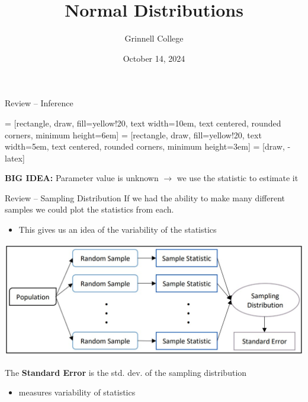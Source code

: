 \documentclass{beamer}
\title[Introduction to Statistics]{Normal Distributions}
\subtitle{}
\author{Grinnell College}
\date{October 14, 2024}
\begin{document}
\begin{frame}
  \titlepage
\end{frame}

\begin{frame}{Review -- Inference}
\begin{center}
\usetikzlibrary{decorations.pathreplacing,positioning, arrows, shapes, calc,shapes.multipart}
 = [rectangle, draw, fill=yellow!20, 
    text width=10em, text centered, rounded corners, minimum height=6em]
 = [rectangle, draw, fill=yellow!20, 
    text width=5em, text centered, rounded corners, minimum height=3em]
 = [draw, -latex]
  \end{center}
\textbf{BIG IDEA:} Parameter value is unknown $\rightarrow$ we use the statistic to estimate it  
\end{frame}

\begin{frame}{Review -- Sampling Distribution}
If we had the ability to make many different samples we could plot the statistics from each.
\begin{itemize}
    \item This gives us an idea of the variability of the statistics
\end{itemize}

\begin{center}
    \includegraphics[scale=.5]{img/sampling_distr_method.jpg}
\end{center}
The \textbf{Standard Error} is the std. dev. of the sampling distribution
\begin{itemize}
    \item measures variability of statistics
\end{itemize}
\end{frame}
\end{document}
